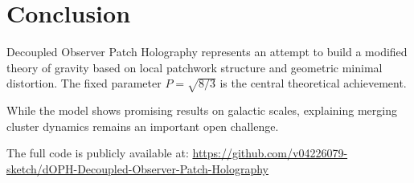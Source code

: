 \documentclass[12pt,a4paper]{article}
\begin{document}
\section{Conclusion}

Decoupled Observer Patch Holography represents an attempt to build a modified theory of gravity based on local patchwork structure and geometric minimal distortion. The fixed parameter \(P = \sqrt{8/3}\) is the central theoretical achievement.

While the model shows promising results on galactic scales, explaining merging cluster dynamics remains an important open challenge.

The full code is publicly available at:  
\url{https://github.com/v04226079-sketch/dOPH-Decoupled-Observer-Patch-Holography}
\end{document}
